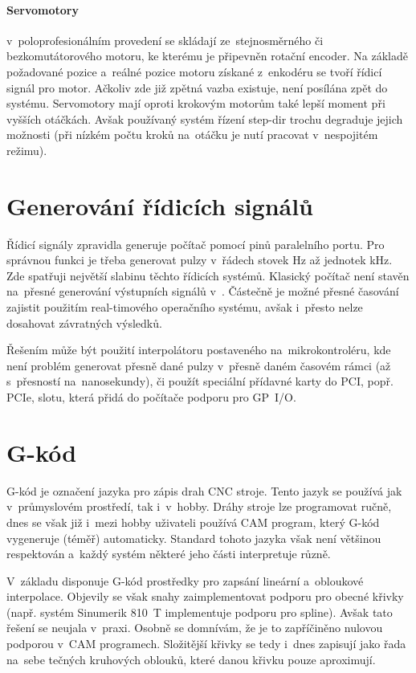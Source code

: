 	\paragraph{Servomotory} v~poloprofesionálním provedení se skládají ze~stejnosměrného či bezkomutátorového motoru, ke kterému je připevněn rotační encoder\cite{servomotor}. Na základě požadované pozice a~reálné pozice motoru získané z~enkodéru se tvoří řídicí signál pro motor. Ačkoliv zde již zpětná vazba existuje, není posílána zpět do systému. Servomotory mají oproti krokovým motorům také lepší moment při vyšších otáčkách\cite{servomotor}. Avšak používaný systém řízení step-dir trochu degraduje jejich možnosti (při nízkém počtu kroků na~otáčku je nutí pracovat v~nespojitém režimu).
	
	\section{Generování řídicích signálů}
	Řídicí signály zpravidla generuje počítač pomocí pinů paralelního portu. Pro správnou funkci je třeba generovat pulzy v~řádech stovek Hz až jednotek kHz. Zde spatřuji největší slabinu těchto řídicích systémů. Klasický počítač není stavěn na~přesné generování výstupních signálů v~. Částečně je možné přesné časování zajistit použitím real-timového operačního systému, avšak i~přesto nelze dosahovat závratných výsledků.
	
	Řešením může být použití interpolátoru postaveného na~mikrokontroléru, kde není problém generovat přesně dané pulzy v~přesně daném časovém rámci (až s~přesností na~nanosekundy), či použít speciální přídavné karty do PCI, popř. PCIe, slotu, která přidá do počítače podporu pro GP~I/O.
	
	\section{G-kód}
	G-kód je označení jazyka pro zápis drah CNC stroje\cite{wiki:gcode}. Tento jazyk se používá jak v~průmyslovém prostředí, tak i~v~hobby. Dráhy stroje lze programovat ručně, dnes se však již i~mezi hobby uživateli používá CAM program, který G-kód vygeneruje (téměř) automaticky. Standard tohoto jazyka však není většinou respektován a~každý systém některé jeho části interpretuje různě.
	
	V~základu disponuje G-kód prostředky pro zapsání lineární a~obloukové interpolace\cite{gcode}. Objevily se však snahy zaimplementovat podporu pro obecné křivky (např. systém Sinumerik 810~T implementuje podporu pro spline\cite{sinumerik}). Avšak tato řešení se neujala v~praxi. Osobně se domnívám, že je to zapříčiněno nulovou podporou v~CAM programech. Složitější křivky se tedy i~dnes zapisují jako řada na~sebe tečných kruhových oblouků, které danou křivku pouze aproximují.
		

